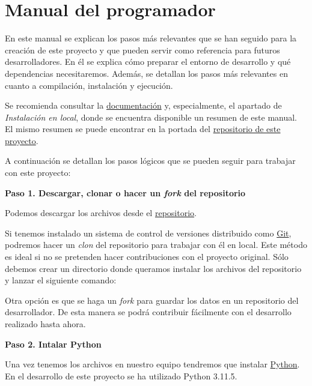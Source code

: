 \section{Manual del programador}\label{manual_programador}

En este manual se explican los pasos más relevantes que se han seguido para la creación de este proyecto y que pueden servir como referencia para futuros desarrolladores. En él se explica cómo preparar el entorno de desarrollo y qué dependencias necesitaremos. Además, se detallan los pasos más relevantes en cuanto a compilación, instalación y ejecución.

Se recomienda consultar la \href{https://fat.readthedocs.io/es/latest/intro.html#}{documentación} y, especialmente, el apartado de \emph{Instalación en local}, donde se encuentra disponible un resumen de este manual. El mismo resumen se puede encontrar en la portada del \href{https://github.com/rmt0009alu/FAT}{repositorio de este proyecto}. 

A continuación se detallan los pasos lógicos que se pueden seguir para trabajar con este proyecto:



\textbf{Paso 1. Descargar, clonar o hacer un \emph{fork} del repositorio}

Podemos descargar los archivos desde el \href{https://github.com/rmt0009alu/FAT}{repositorio}. 


Si tenemos instalado un sistema de control de versiones distribuido como \href{https://git-scm.com/downloads}{Git}, podremos hacer un \emph{clon} del repositorio para trabajar con él en local. Este método es ideal si no se pretenden hacer contribuciones con el proyecto original. Sólo debemos crear un directorio donde queramos instalar los archivos del repositorio y lanzar el siguiente comando:


Otra opción es que se haga un \emph{fork} para guardar los datos en un repositorio del desarrollador. De esta manera se podrá contribuir fácilmente con el desarrollo realizado hasta ahora. 



\textbf{Paso 2. Intalar Python}

Una vez tenemos los archivos en nuestro equipo tendremos que instalar \href{https://www.python.org/downloads/}{Python}. En el desarrollo de este proyecto se ha utilizado Python 3.11.5. 



